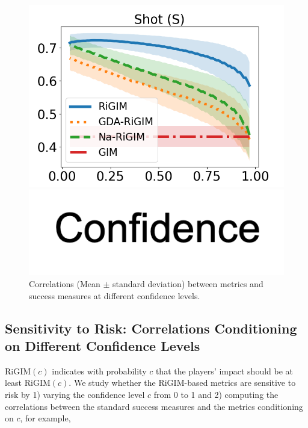 \documentclass{article}
\newcommand{\confidence}{c}
\newcommand{\sys}{RiGIM}
\begin{document}
\begin{figure}[htbp]
\begin{minipage}{0.16\textwidth}
    \includegraphics[scale=0.17]{figures/risk_curve_S_shadow.png}\par
    \vspace{-0.05in}
    \includegraphics[scale=0.15]{figures/confidence_x_label.png}
    \end{minipage}
    \vspace{-0.15in}
    \caption{Correlations (Mean $\pm$ standard deviation) between metrics and success measures at different confidence levels.}
    \vspace{-0.05in}
    \label{fig:risk-sensitivity}
\end{figure}

\subsection{Sensitivity to Risk: Correlations Conditioning on Different Confidence Levels}
\sys$(c)$ indicates with probability $\confidence$ that the players' impact should be at least \sys$(\confidence)$.
We study whether the \sys-based metrics are sensitive to risk by 1) varying the confidence level $\confidence$ from 0 to 1 and 2) computing the correlations between the standard success measures and the metrics conditioning on $\confidence$, for example, 
\end{document}
